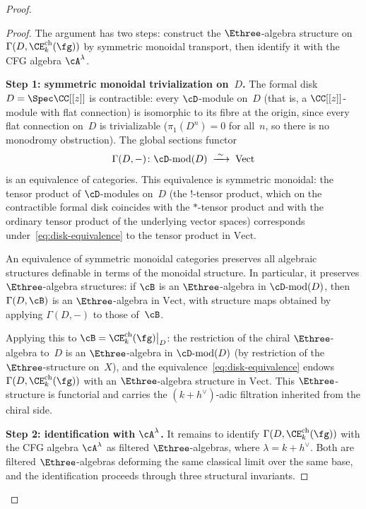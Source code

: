 \begin{proof}
\begin{proof}
The argument has two steps: construct the $\Ethree$-algebra
structure on $\Gamma(D, \CE^{\mathrm{ch}}_k(\fg))$
by symmetric monoidal transport, then identify it with the
CFG algebra $\cA^\lambda$.

\smallskip
\noindent\textbf{Step 1: symmetric monoidal trivialization
on~$D$.}
The formal disk $D = \Spec \CC[[z]]$ is contractible:
every $\cD$-module on~$D$ (that is, a $\CC[[z]]$-module
with flat connection) is isomorphic to its fibre at the
origin, since every flat connection on~$D$ is
trivializable ($\pi_1(D^n) = 0$ for all~$n$, so there is
no monodromy obstruction). The global sections functor
\begin{equation}\label{eq:disk-equivalence}
  \Gamma(D, -) \colon
  \cD\textrm{-}\mathrm{mod}(D) \;\xrightarrow{\;\sim\;}\;
  \mathrm{Vect}
\end{equation}
is an equivalence of categories. This equivalence is
symmetric monoidal: the tensor product of $\cD$-modules
on~$D$ (the $!$-tensor product, which on the contractible
formal disk coincides with the $*$-tensor product and with
the ordinary tensor product of the underlying vector
spaces) corresponds under~\eqref{eq:disk-equivalence} to
the tensor product in $\mathrm{Vect}$.

An equivalence of symmetric monoidal categories preserves
all algebraic structures definable in terms of the monoidal
structure. In particular, it preserves $\Ethree$-algebra
structures: if $\cB$ is an $\Ethree$-algebra in
$\cD\textrm{-}\mathrm{mod}(D)$, then
$\Gamma(D, \cB)$ is an $\Ethree$-algebra in
$\mathrm{Vect}$, with structure maps obtained by applying
$\Gamma(D, -)$ to those of~$\cB$.

Applying this to
$\cB = \CE^{\mathrm{ch}}_k(\fg)\big|_D$: the
restriction of the chiral $\Ethree$-algebra to~$D$ is an
$\Ethree$-algebra in $\cD\textrm{-}\mathrm{mod}(D)$ (by
restriction of the $\Ethree$-structure on~$X$), and the
equivalence~\eqref{eq:disk-equivalence} endows
$\Gamma(D, \CE^{\mathrm{ch}}_k(\fg))$ with an
$\Ethree$-algebra structure in $\mathrm{Vect}$. This
$\Ethree$-structure is functorial and carries the
$(k+h^\vee)$-adic filtration inherited from the chiral side.

\smallskip
\noindent\textbf{Step 2: identification with $\cA^\lambda$.}
It remains to identify
$\Gamma(D, \CE^{\mathrm{ch}}_k(\fg))$ with the CFG
algebra $\cA^\lambda$ as filtered $\Ethree$-algebras,
where $\lambda = k + h^\vee$. Both are filtered
$\Ethree$-algebras deforming the same classical limit over
the same base, and the identification proceeds through
three structural invariants.


\end{proof}
\end{proof}
